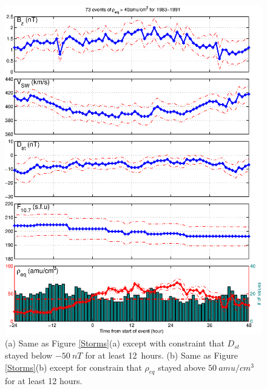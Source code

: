\documentclass[10pt,twocolumn]{article}
\begin{document}
\begin{figure}[htp!]
\includegraphics[scale=0.45]{paperfigures/stormavs-md12.eps}
\caption{(a) Same as Figure \ref{Storms}(a) except with constraint that $D_{st}$ stayed below $-50~nT$ for at least 12~hours. (b) Same as Figure \ref{Storms}(b) except for constrain that $\rho_{eq}$ stayed above $50~amu/cm^3$ for at least 12 hours.}
\label{Mspec}
\end{figure}
\clearpage
\end{document}
